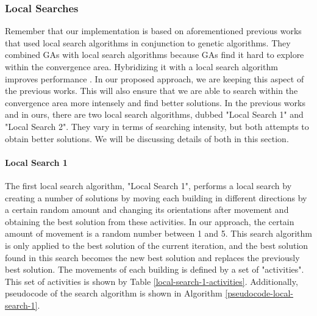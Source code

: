 \subsubsection{Local Searches}
Remember that our implementation is based on aforementioned previous works that used local search algorithms in conjunction to genetic algorithms. They combined GAs with local search algorithms because GAs find it hard to explore within the convergence area. Hybridizing it with a local search algorithm improves performance \cite{Ripon2013}. In our proposed approach, we are keeping this aspect of the previous works. This will also ensure that we are able to search within the convergence area more intensely and find better solutions. In the previous works and in ours, there are two local search algorithms, dubbed "Local Search 1" and "Local Search 2". They vary in terms of searching intensity, but both attempts to obtain better solutions. We will be discussing details of both in this section.

\paragraph{Local Search 1}
The first local search algorithm, "Local Search 1", performs a local search by creating a number of solutions by moving each building in different directions by a certain random amount and changing its orientations after movement and obtaining the best solution from these activities. In our approach, the certain amount of movement is a random number between 1 and 5. This search algorithm is only applied to the best solution of the current iteration, and the best solution found in this search becomes the new best solution and replaces the previously best solution. The movements of each building is defined by a set of "activities". This set of activities is shown by Table \ref{local-search-1-activities}. Additionally, pseudocode of the search algorithm is shown in Algorithm \ref{pseudocode-local-search-1}.

